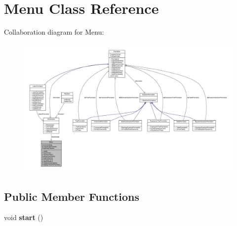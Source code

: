 \hypertarget{classMenu}{}\section{Menu Class Reference}
\label{classMenu}


Collaboration diagram for Menu\+:
\nopagebreak
\begin{figure}[H]
\begin{center}
\leavevmode
\includegraphics[width=350pt]{classMenu__coll__graph}
\end{center}
\end{figure}
\subsection*{Public Member Functions}
\begin{DoxyCompactItemize}
\item 
void {\bfseries start} ()\hypertarget{classMenu_ae1ec62e738dda7faaaec850bd0b58ffe}{}\label{classMenu_ae1ec62e738dda7faaaec850bd0b58ffe}

\end{DoxyCompactItemize}
